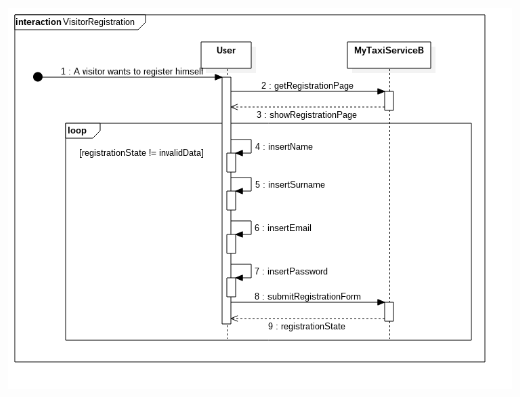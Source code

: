 \documentclass[11pt]{article} %
\begin{document}
\begin{enumerate}
\begin{center}
		\includegraphics[scale=0.52]{usecase8.png}
		\end{center}
	

\end{enumerate}
\end{document}
